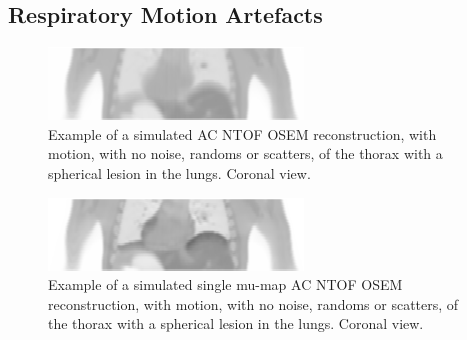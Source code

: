         
        \subsection{Respiratory Motion Artefacts} \label{sec:respiratory_motion_artefacts}
            
            \begin{figure}
                \centering
                
                \includegraphics[width=1.0\linewidth]{figures/background_motion_artefact_example.png}
                
                \captionsetup{singlelinecheck=false, justification=raggedright}
                \caption{Example of a simulated \gls{AC} \gls{NTOF} \gls{OSEM} reconstruction, with motion, with no noise, randoms or scatters, of the thorax with a spherical lesion in the lungs. Coronal view.}
                \label{fig:respiratory_motion_artefacts_motion_artefact}
            \end{figure}
            
            \begin{figure}
                \centering
                
                \includegraphics[width=1.0\linewidth]{figures/background_single_mu-map_ac_example.png}
                
                \captionsetup{singlelinecheck=false, justification=raggedright}
                \caption{Example of a simulated single \gls{mu-map} \gls{AC} \gls{NTOF} \gls{OSEM} reconstruction, with motion, with no noise, randoms or scatters, of the thorax with a spherical lesion in the lungs. Coronal view.}
                \label{fig:respiratory_motion_artefacts_single_mu-map_ac}
            \end{figure}
            
